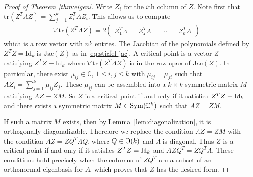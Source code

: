 \documentclass[12pt]{extarticle}
\theoremstyle{definition}
\numberwithin{theorem}{section}
\newcommand{\CC}{\mathbb{C}}
\begin{document}
\begin{proof}[Proof of Theorem \ref{thm:eigen}]
  Write $Z_i$ for the $i$th column of $Z$. 
  Note first that $\textrm{tr} (Z^T A Z) = \sum_{j = 1}^k Z_i^T A Z_i$.
  This allows us to compute
  \begin{align*}
    \nabla \textrm{tr} (Z^T A Z) = 2\begin{pmatrix} Z_1^TA && Z_2^TA && \cdots && Z_k^T A \end{pmatrix}
  \end{align*}
  which is a row vector with $nk$ entries.
  The Jacobian of the polynomials defined by $Z^TZ = \textrm{Id}_k$ is $ \mathrm{Jac}(Z)$ as in \eqref{eq:stiefel-jac}.
  A critical point is a vector
  ${Z}$ satisfying ${Z}^T{Z} = \textrm{Id}_k$ where $\nabla \textrm{tr}({Z}^TA{Z})$ is in the row span of $\mathrm{Jac}({Z})$. 
  In particular, there exist $\mu_{ij} \in \CC$, $1 \leq i, j \leq k$ with $\mu_{ij} = \mu_{ji}$ such that $A Z_i =  \sum_{j=1}^k \mu_{ij} Z_j$. 
  These $\mu_{ij}$ can be assembled into a $k \times k$ symmetric matrix $M$ satisfying $A{ Z} = ZM$. 
  So $ Z$ is a critical point if and only if it satisfies ${ Z}^T { Z} = {\rm Id}_{k}$ and there exists a symmetric matrix $M \in {\rm Sym}({\CC}^k)$ such that $A{Z} = { Z} M$.

  If such a matrix $M$ exists, then by Lemma~\ref{lem:diagonalization}, it is orthogonally diagonalizable. 
  Therefore we replace the condition $A{ Z} = { Z}M$ with the condition $A{ Z} =  Z Q^T \Lambda Q$. where $Q \in {\rm O}(k)$ and $\Lambda$ is diagonal.
  Thus $ Z$ is a critical point if and only if it satisfies $ Z^T Z= {\rm Id}_k$ and $A ZQ^T =  ZQ^T \Lambda$. 
  These conditions hold precisely when the columns of $ZQ^T$ are a subset of an orthonormal eigenbasis for $A$, which proves that $ Z$ has the desired form. 
\end{proof}
\end{document}
